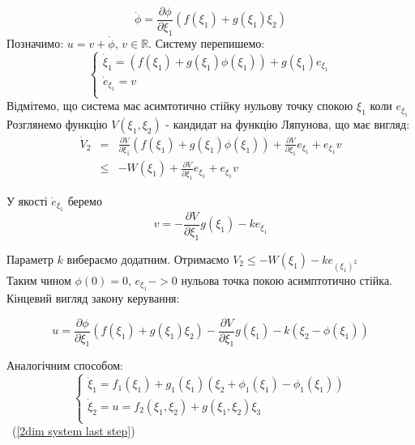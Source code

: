 \documentclass{article}
\begin{document}
\begin{equation}
    \dot\phi = \frac{\partial \phi}{\partial \xi_1}(f(\xi_1)+g(\xi_1)\xi_2)
\end{equation}
Позначимо: $u = v + \dot\phi$, $v \in \mathbb{R}$.
Систему перепишемо:
\begin{equation}
    \begin{cases}
        \dot \xi_1 = (f(\xi_1)+g(\xi_1)\phi(\xi_1))+g(\xi_1)e_{\xi_1}\\
        \dot e_{\xi_1} = v\\
    \end{cases}
\end{equation}
Відмітемо, що система має асимтотично стійку нульову точку спокою $\xi_1$ коли $e_{\xi_1}$
Розглянемо функцію $V(\xi_1,\xi_2)$ - кандидат на функцію Ляпунова, що має вигляд:
\begin{eqnarray}
    \dot V_2 &=& \frac{\partial V}{\partial \xi_1}(f(\xi_1)+g(\xi_1)\phi(\xi_1))+
    \frac{\partial V}{\partial \xi_1}e_{\xi_1}+e_{\xi_1}v\\
    &\leq& -W(\xi_1)+ \frac{\partial V}{\partial \xi_1}e_{\xi_1}+e_{\xi_1}v
\end{eqnarray}

У якості $\dot e_{\xi_1}$ беремо 
\begin{equation}
    v = - \frac{\partial V}{\partial \xi_1}g(\xi_1) - ke_{\xi_1}
\end{equation}

Параметр $k$ вибераємо додатним.
Отримаємо $V_2 \leq -W(\xi_1) - ke_{(\xi_1)^2}$ \\
Таким чином $\phi(0)=0$, $e_{\xi_1} -> 0$ нульова точка покою асимптотично стійка.
Кінцевий вигляд закону керування:

\begin{equation}
    u = \frac{\partial \phi}{\partial \xi_1}(f(\xi_1)+g(\xi_1)\xi_2)-
    \frac{\partial V}{\partial \xi_1}g(\xi_1)-k(\xi_2-\phi(\xi_1))
\end{equation}

Аналогічним способом:
\begin{equation} \label{2dim system last step}
    \begin{cases}
        \dot \xi_1 = f_1(\xi_1)+g_1(\xi_1)(\xi_2 + \phi_1(\xi_1)-\phi_1(\xi_1))\\
        \dot \xi_2 = u = f_2(\xi_1,\xi_2)+g(\xi_1,\xi_2)\xi_3\\
    \end{cases}
\end{equation}
~(\ref{2dim system last step})
\end{document}
